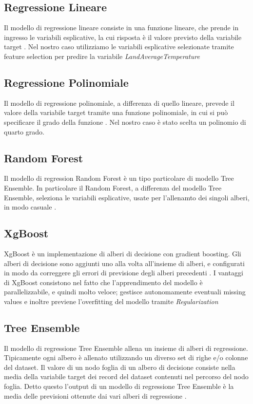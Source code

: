 \documentclass[12pt, a4paper, twocolumn]{article} %
\begin{document}
\subsection{Regressione Lineare}
Il modello di regressione lineare consiste in una funzione lineare, che prende in ingresso le variabili esplicative, la cui risposta è il valore previsto della variabile target \cite{mlbook}. Nel nostro caso utilizziamo le variabili esplicative selezionate tramite feature selection per predire la variabile \textit{LandAverageTemperature}

\subsection{Regressione Polinomiale}
Il modello di regressione polinomiale, a differenza di quello lineare, prevede il valore della variabile target tramite una funzione polinomiale, in cui si può specificare il grado della funzione \cite{mlbook}. Nel nostro caso è stato scelta un polinomio di quarto grado.

\subsection{Random Forest}
Il modello di regression Random Forest è un tipo particolare di modello Tree Ensemble. In particolare il Random Forest, a differenza del modello Tree Ensemble, seleziona le variabili esplicative, usate per l'allenamto dei singoli alberi, in modo casuale \cite{randomforest}.

\subsection{XgBoost}
XgBoost è un implementazione di alberi di decisione con gradient boosting. Gli alberi di decisione sono aggiunti uno alla volta all'insieme di alberi, e configurati in modo da correggere gli errori di previsione degli alberi precedenti \cite{xgboost}. I vantaggi di XgBoost consistono nel fatto che l'apprendimento del modello è parallelizzabile, e quindi molto veloce; gestisce autonomamente eventuali missing values e inoltre previene l'overfitting del modello tramite \textit{Regularization}

\subsection{Tree Ensemble}
Il modello di regressione Tree Ensemble allena un insieme di alberi di regressione. Tipicamente ogni albero è allenato utilizzando un diverso set di righe e/o colonne del dataset. Il valore di un nodo foglia di un albero di decisione consiste nella media della variabile target dei record del dataset contenuti nel percorso del nodo foglia. Detto questo l'output di un modello di regressione Tree Ensemble è la media delle previsioni ottenute dai vari alberi di regressione \cite{treeensemble}.
\end{document}
